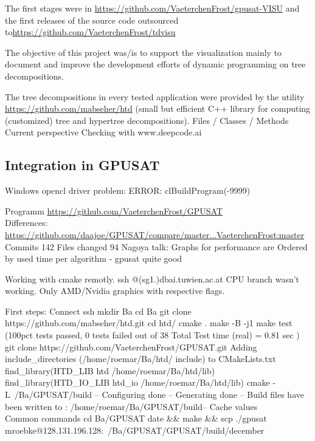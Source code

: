 \documentclass[a4paper, 12pt]{scrartcl}
\begin{document}
The first stages were in \url{https://github.com/VaeterchenFrost/gpusat-VISU} and the first releases of the source code outsourced to\url{https://github.com/VaeterchenFrost/tdvisu}

The objective of this project was/is to support the visualization mainly to document and improve the development efforts of dynamic programming on tree decompositions.

The tree decompositions in every tested application were provided by the utility \url{https://github.com/mabseher/htd} (small but efficient C++ library for computing (customized) tree and hypertree decompositions).
Files / Classes / Methods
Current 
perspective 
Checking with www.deepcode.ai

\newpage
\subsection{Integration in GPUSAT}
Windows opencl driver problem: ERROR: clBuildProgram(-9999)

Programm \url{https://github.com/VaeterchenFrost/GPUSAT} \\
Differences: \url{https://github.com/daajoe/GPUSAT/compare/master...VaeterchenFrost:master}  Commits 142 Files changed 94 
Nagoya talk:
Graphs for performance are Ordered by used time per algorithm - gpusat quite good

Working with cmake remotly. ssh @(sg1.)dbai.tuwien.ac.at
CPU branch wasn't working.
Only AMD/Nvidia graphics  with respective flags.

First steps:
Connect ssh
mkdir Ba
cd Ba
git clone https://github.com/mabseher/htd.git
 cd htd/
 cmake .
 make -B -j1 
 make test
 (100pct tests passed, 0 tests failed out of 38                                                                                                                                                                                                                                                                                                             Total Test time (real) =   0.81 sec )\\

git clone https://github.com/VaeterchenFrost/GPUSAT.git
Adding include_directories (/home/roemar/Ba/htd/
include) to CMakeLists.txt \\
find_library(HTD_LIB htd /home/roemar/Ba/htd/lib)
find_library(HTD_IO_LIB htd_io /home/roemar/Ba/htd/lib) 
cmake - L~/Ba/GPUSAT/build
-- Configuring done
-- Generating done
-- Build files have been written to : /home/roemar/Ba/GPUSAT/build-- Cache values 
\\
Common commands
cd Ba/GPUSAT      
date \&\& make \&\& scp ./gpusat mroebke@128.131.196.128:~/Ba/GPUSAT/GPUSAT/build/december
\end{document}

